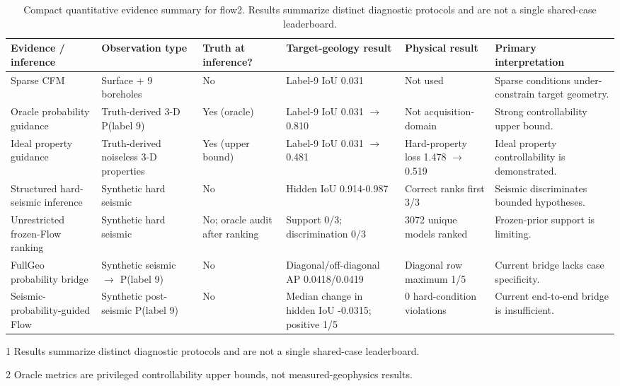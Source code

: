 \begin{table}[t]
\centering
\small
\begin{threeparttable}
\caption{Compact quantitative evidence summary for flow2. Results summarize distinct diagnostic protocols and are not a single shared-case leaderboard.}
\label{tab:evidence-summary}
\begin{tabularx}{\textwidth}{@{}p{}p{}p{}p{}p{}X@{}}
\toprule
Evidence / inference & Observation type & Truth at inference? & Target-geology result & Physical result & Primary interpretation \\
\midrule
Sparse CFM & Surface + 9 boreholes & No & Label-9 IoU 0.031 & Not used & Sparse conditions under-constrain target geometry. \\
Oracle probability guidance & Truth-derived 3-D P(label 9) & Yes (oracle) & Label-9 IoU 0.031 $\rightarrow$ 0.810 & Not acquisition-domain & Strong controllability upper bound. \\
Ideal property guidance & Truth-derived noiseless 3-D properties & Yes (upper bound) & Label-9 IoU 0.031 $\rightarrow$ 0.481 & Hard-property loss 1.478 $\rightarrow$ 0.519 & Ideal property controllability is demonstrated. \\
Structured hard-seismic inference & Synthetic hard seismic & No & Hidden IoU 0.914-0.987 & Correct ranks first 3/3 & Seismic discriminates bounded hypotheses. \\
Unrestricted frozen-Flow ranking & Synthetic hard seismic & No; oracle audit after ranking & Support 0/3; discrimination 0/3 & 3072 unique models ranked & Frozen-prior support is limiting. \\
FullGeo probability bridge & Synthetic seismic $\rightarrow$ P(label 9) & No & Diagonal/off-diagonal AP 0.0418/0.0419 & Diagonal row maximum 1/5 & Current bridge lacks case specificity. \\
Seismic-probability-guided Flow & Synthetic post-seismic P(label 9) & No & Median change in hidden IoU -0.0315; positive 1/5 & 0 hard-condition violations & Current end-to-end bridge is insufficient. \\
\bottomrule
\end{tabularx}
\begin{tablenotes}[flushleft]
\item[1] Results summarize distinct diagnostic protocols and are not a single shared-case leaderboard.
\item[2] Oracle metrics are privileged controllability upper bounds, not measured-geophysics results.

\end{tablenotes}
\end{threeparttable}
\end{table}
